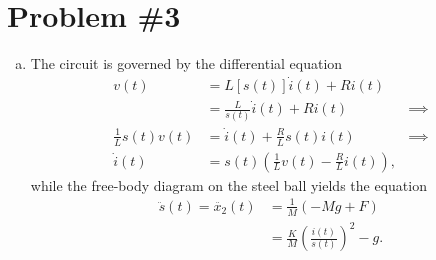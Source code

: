 \documentclass{article}
\begin{document}
\section*{Problem \#3}

\begin{enumerate}[(a)]
  \item{The circuit is governed by the differential equation
        \begin{align*}
          v(t) & = L[s(t)]\dot{i}(t) + Ri(t) \\
               & = \frac{L}{s(t)} \dot{i}(t) + Ri(t) & \implies \\
          \frac{1}{L}s(t) v(t) 
             & = \dot{i}(t) + \frac{R}{L} s(t) i(t) & \implies \\
          \dot{i}(t) & = s(t) \left(\frac{1}{L} v(t) - \frac{R}{L} i(t)\right),
        \end{align*}
        while the free-body diagram on the steel ball yields the equation
        \begin{align*}
          \ddot{s}(t) = \ddot{x_2}(t) 
            & = \frac{1}{M}\left(-Mg + F\right) \\
            & = \frac{K}{M} \left(\frac{i(t)}{s(t)}\right)^2  - g.
        \end{align*}

}
\end{enumerate}
\end{document}
